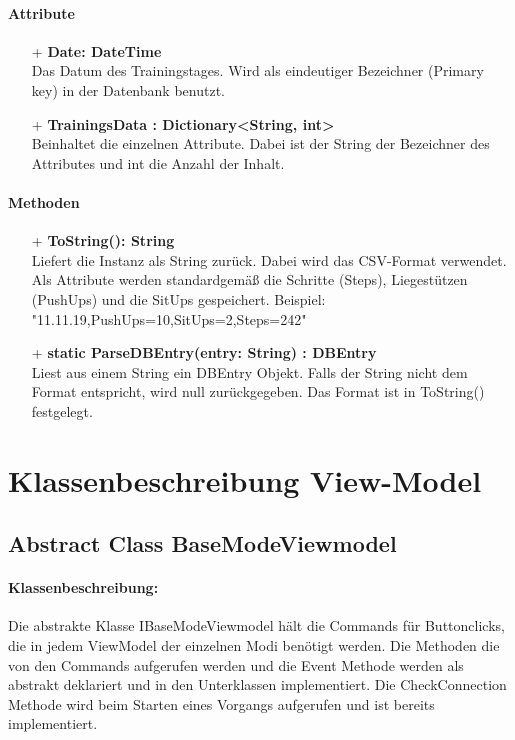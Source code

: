 \documentclass[a4paper,12pt]{article}
\begin{document}
	\paragraph{Attribute}
	\begin{itemize}
		\item[+] \textbf{Date: DateTime}\\Das Datum des Trainingstages. Wird als eindeutiger Bezeichner (Primary key) in der \Gls{Datenbank} benutzt.\\
			\item[+] \textbf{TrainingsData : Dictionary<String, int>}\\ Beinhaltet die einzelnen Attribute. Dabei ist der String der Bezeichner des Attributes und int die Anzahl der Inhalt. 
	\end{itemize}
	 
	 \paragraph{Methoden}
	 \begin{itemize}
	 	\item[+] \textbf{ToString(): String}\\Liefert die Instanz als String zurück. Dabei wird das \gls{CSV}-Format verwendet. Als Attribute werden standardgemäß die Schritte (Steps), Liegestützen (PushUps) und die SitUps gespeichert.
	 	Beispiel: "11.11.19,PushUps=10,SitUps=2,Steps=242"\\
	 	\item[+] \textbf{static ParseDBEntry(entry: String) : DBEntry}\\Liest aus einem String ein DBEntry Objekt. Falls der String nicht dem Format entspricht, wird null zurückgegeben. Das Format ist in ToString() festgelegt.\\
	\end{itemize}











\section{Klassenbeschreibung View-Model}
\subsection{Abstract Class BaseModeViewmodel} 
\paragraph{Klassenbeschreibung:}
Die abstrakte Klasse IBaseModeViewmodel hält die Commands für Buttonclicks, die in jedem ViewModel der einzelnen Modi benötigt werden. Die Methoden die von den Commands aufgerufen werden und die Event Methode werden als abstrakt deklariert und in den Unterklassen implementiert. Die CheckConnection Methode wird beim Starten eines Vorgangs aufgerufen und ist bereits implementiert.
\end{document}
